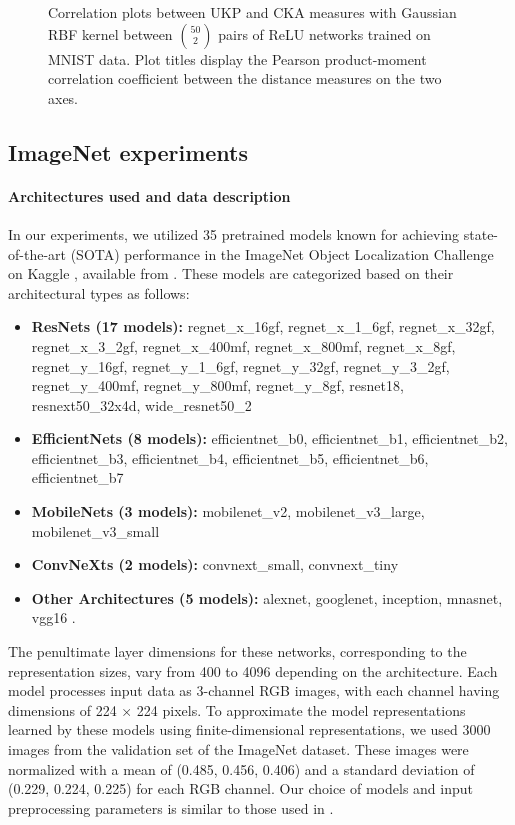 \documentclass[11pt]{article}
\theoremstyle{plain}
\begin{document}
\begin{figure}[!h]
    \caption{Correlation plots between UKP and CKA measures with Gaussian RBF kernel between $\binom{50}{2}$ pairs of ReLU networks trained on MNIST data. Plot titles display the Pearson product-moment correlation coefficient between the distance measures on the two axes.}

    \label{MNIST correlation plots bw UKP CKA}
\end{figure}

\FloatBarrier

\subsection{ImageNet experiments}
\label{Additional ImageNet experiments}

\paragraph{Architectures used and data description} In our experiments, we utilized 35 pretrained models known for achieving state-of-the-art (SOTA) performance in the ImageNet Object Localization Challenge on Kaggle \cite{imagenet-object-localization-challenge}, available from \citet{pytorch}. These models are categorized based on their architectural types as follows:

\begin{itemize}
    \item \textbf{ResNets (17 models):} regnet\_x\_16gf, regnet\_x\_1\_6gf, regnet\_x\_32gf, regnet\_x\_3\_2gf, regnet\_x\_400mf, regnet\_x\_800mf, regnet\_x\_8gf, regnet\_y\_16gf, regnet\_y\_1\_6gf, regnet\_y\_32gf, regnet\_y\_3\_2gf, regnet\_y\_400mf, regnet\_y\_800mf, regnet\_y\_8gf, resnet18, resnext50\_32x4d, wide\_resnet50\_2
    \item \textbf{EfficientNets (8 models):} efficientnet\_b0, efficientnet\_b1, efficientnet\_b2, efficientnet\_b3, efficientnet\_b4, efficientnet\_b5, efficientnet\_b6, efficientnet\_b7
    \item \textbf{MobileNets (3 models):} mobilenet\_v2, mobilenet\_v3\_large, mobilenet\_v3\_small
    \item \textbf{ConvNeXts (2 models):} convnext\_small, convnext\_tiny
    \item \textbf{Other Architectures (5 models):} alexnet, googlenet, inception, mnasnet, vgg16 .
\end{itemize}

The penultimate layer dimensions for these networks, corresponding to the representation sizes, vary from 400 to 4096 depending on the architecture. Each model processes input data as 3-channel RGB images, with each channel having dimensions of 224 × 224 pixels. To approximate the model representations learned by these models using finite-dimensional representations, we used 3000 images from the validation set of the ImageNet dataset. These images were normalized with a mean of (0.485, 0.456, 0.406) and a standard deviation of (0.229, 0.224, 0.225) for each RGB channel. Our choice of models and input preprocessing parameters is similar to those used in \citet{GULP}.
\end{document}
